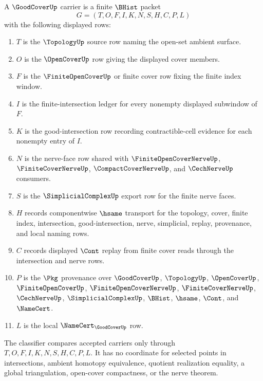 \begin{definition}
\label{def:good-cover-carrier}
A $\GoodCoverUp$ carrier is a finite $\BHist$ packet
$$
G=(T,O,F,I,K,N,S,H,C,P,L)
$$
with the following displayed rows:
\begin{enumerate}
\item $T$ is the $\TopologyUp$ source row naming the open-set ambient surface.
\item $O$ is the $\OpenCoverUp$ row giving the displayed cover members.
\item $F$ is the $\FiniteOpenCoverUp$ or finite cover row fixing the finite index window.
\item $I$ is the finite-intersection ledger for every nonempty displayed subwindow of $F$.
\item $K$ is the good-intersection row recording contractible-cell evidence for each nonempty entry of $I$.
\item $N$ is the nerve-face row shared with $\FiniteOpenCoverNerveUp$, $\FiniteCoverNerveUp$, $\CompactCoverNerveUp$, and $\CechNerveUp$ consumers.
\item $S$ is the $\SimplicialComplexUp$ export row for the finite nerve faces.
\item $H$ records componentwise $\hsame$ transport for the topology, cover, finite index, intersection, good-intersection, nerve, simplicial, replay, provenance, and local naming rows.
\item $C$ records displayed $\Cont$ replay from finite cover reads through the intersection and nerve rows.
\item $P$ is the $\Pkg$ provenance over $\GoodCoverUp$, $\TopologyUp$, $\OpenCoverUp$, $\FiniteOpenCoverUp$, $\FiniteOpenCoverNerveUp$, $\FiniteCoverNerveUp$, $\CechNerveUp$, $\SimplicialComplexUp$, $\BHist$, $\hsame$, $\Cont$, and $\NameCert$.
\item $L$ is the local $\NameCert_{\GoodCoverUp}$ row.
\end{enumerate}
The classifier compares accepted carriers only through $T,O,F,I,K,N,S,H,C,P,L$. It has no coordinate for selected points in intersections, ambient homotopy equivalence, quotient realization equality, a global triangulation, open-cover compactness, or the nerve theorem.
\end{definition}

